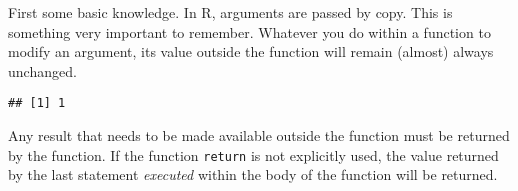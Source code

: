 \documentclass[paper=a4,headsepline,BCOR=12mm,twoside,open=right,%
titlepage,headings=small,fontsize=10pt,index=totoc,bibliography=totoc,%
captions=tableheading,captions=nooneline]{scrbook}\usepackage{knitr}
\begin{document}
First some basic knowledge. In R, arguments are passed by copy. This is something very important to remember. Whatever you do within a function to modify an argument, its value outside the function will remain (almost) always unchanged.

\begin{knitrout}\footnotesize
{}\color{fgcolor}\begin{kframe}
\begin{alltt}
 \hlkwb{<-} \hlstd{(} \hlkwb{<-} \hlstd{\}}
 \hlkwb{<-} 
\end{alltt}
\begin{verbatim}
## [1] 1
\end{verbatim}
\end{kframe}
\end{knitrout}

Any result that needs to be made available outside the function must be returned by the function. If the function \texttt{return} is not explicitly used, the value returned by the last statement \emph{executed} within the body of the function will be returned.
\end{document}
